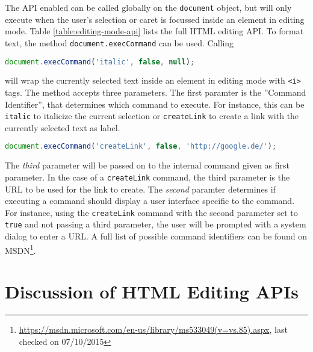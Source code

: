The API enabled can be called globally on the \texttt{document} object, but will only execute when the user's selection or caret is focussed inside an element in editing mode. Table \ref{table:editing-mode-api} lists the full HTML editing API. To format text, the method \texttt{document.execCommand} can be used. Calling

\begin{lstlisting}[language=JavaScript, caption=Emphasizing text using the HTML editing API, label=lst:execcommand-italics]
document.execCommand('italic', false, null);
\end{lstlisting}

\noindent will wrap the currently selected text inside an element in editing mode with \texttt{<i>} tags. The method accepts three parameters. The first paramter is the ''Command Identifier'', that determines which command to execute. For instance, this can be \texttt{italic} to italicize the current selection or \texttt{createLink} to create a link with the currently selected text as label.

\begin{lstlisting}[language=JavaScript, caption=Creating a link using the HTML editing API, label=lst:execcommand-link]
document.execCommand('createLink', false, 'http://google.de/');
\end{lstlisting}

The \textit{third} parameter will be passed on to the internal command given as first parameter. In the case of a \texttt{createLink} command, the third parameter is the URL to be used for the link to create. The \textit{second} paramter determines if executing a command should display a user interface specific to the command. For instance, using the \texttt{createLink} command with the second parameter set to \texttt{true} and not passing a third parameter, the user will be prompted with a system dialog to enter a URL. A full list of possible command identifiers can be found on MSDN\footnote{\url{https://msdn.microsoft.com/en-us/library/ms533049(v=vs.85).aspx}, last checked on 07/10/2015}.

\section{Discussion of HTML Editing APIs}

